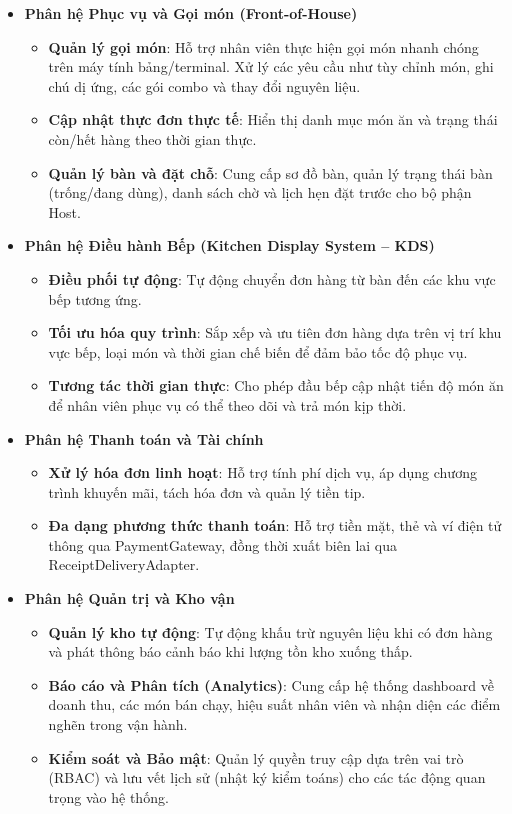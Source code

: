 \begin{itemize}
    \item \textbf{Phân hệ Phục vụ và Gọi món (Front-of-House)}
    \begin{itemize}
        \item \textbf{Quản lý gọi món}: Hỗ trợ nhân viên thực hiện gọi món nhanh chóng trên máy tính bảng/terminal. Xử lý các yêu cầu như tùy chỉnh món, ghi chú dị ứng, các gói combo và thay đổi nguyên liệu.
        \item \textbf{Cập nhật thực đơn thực tế}: Hiển thị danh mục món ăn và trạng thái còn/hết hàng theo thời gian thực.
        \item \textbf{Quản lý bàn và đặt chỗ}: Cung cấp sơ đồ bàn, quản lý trạng thái bàn (trống/đang dùng), danh sách chờ và lịch hẹn đặt trước cho bộ phận Host.
    \end{itemize}

    \item \textbf{Phân hệ Điều hành Bếp (Kitchen Display System -- KDS)}
    \begin{itemize}
        \item \textbf{Điều phối tự động}: Tự động chuyển đơn hàng từ bàn đến các khu vực bếp tương ứng.
        \item \textbf{Tối ưu hóa quy trình}: Sắp xếp và ưu tiên đơn hàng dựa trên vị trí khu vực bếp, loại món và thời gian chế biến để đảm bảo tốc độ phục vụ.
        \item \textbf{Tương tác thời gian thực}: Cho phép đầu bếp cập nhật tiến độ món ăn để nhân viên phục vụ có thể theo dõi và trả món kịp thời.
    \end{itemize}

    \item \textbf{Phân hệ Thanh toán và Tài chính}
    \begin{itemize}
        \item \textbf{Xử lý hóa đơn linh hoạt}: Hỗ trợ tính phí dịch vụ, áp dụng chương trình khuyến mãi, tách hóa đơn và quản lý tiền tip.
        \item \textbf{Đa dạng phương thức thanh toán}: Hỗ trợ tiền mặt, thẻ và ví điện tử thông qua \textsf{PaymentGateway}, đồng thời xuất biên lai qua \textsf{ReceiptDeliveryAdapter}.
    \end{itemize}

    \item \textbf{Phân hệ Quản trị và Kho vận}
    \begin{itemize}
        \item \textbf{Quản lý kho tự động}: Tự động khấu trừ nguyên liệu khi có đơn hàng và phát thông báo cảnh báo khi lượng tồn kho xuống thấp.
        \item \textbf{Báo cáo và Phân tích (Analytics)}: Cung cấp hệ thống dashboard về doanh thu, các món bán chạy, hiệu suất nhân viên và nhận diện các điểm nghẽn trong vận hành.
        \item \textbf{Kiểm soát và Bảo mật}: Quản lý quyền truy cập dựa trên vai trò (RBAC) và lưu vết lịch sử (nhật ký kiểm toáns) cho các tác động quan trọng vào hệ thống.
    \end{itemize}
\end{itemize}

